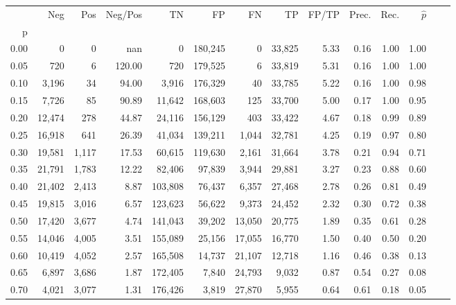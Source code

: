 \begin{tabular}{rrrrrrrrrrrrrr}
\toprule
{} &     Neg &    Pos & Neg/Pos &       TN &       FP &      FN &      TP & FP/TP & Prec. &  Rec. & $\hat{p}$ \\
p    &         &        &         &          &          &         &         &       &       &       &           \\
\midrule
0.00 &       0 &      0 &     nan &        0 &  180,245 &       0 &  33,825 &  5.33 &  0.16 &  1.00 &      1.00 \\
0.05 &     720 &      6 &  120.00 &      720 &  179,525 &       6 &  33,819 &  5.31 &  0.16 &  1.00 &      1.00 \\
0.10 &   3,196 &     34 &   94.00 &    3,916 &  176,329 &      40 &  33,785 &  5.22 &  0.16 &  1.00 &      0.98 \\
0.15 &   7,726 &     85 &   90.89 &   11,642 &  168,603 &     125 &  33,700 &  5.00 &  0.17 &  1.00 &      0.95 \\
0.20 &  12,474 &    278 &   44.87 &   24,116 &  156,129 &     403 &  33,422 &  4.67 &  0.18 &  0.99 &      0.89 \\
0.25 &  16,918 &    641 &   26.39 &   41,034 &  139,211 &   1,044 &  32,781 &  4.25 &  0.19 &  0.97 &      0.80 \\
0.30 &  19,581 &  1,117 &   17.53 &   60,615 &  119,630 &   2,161 &  31,664 &  3.78 &  0.21 &  0.94 &      0.71 \\
0.35 &  21,791 &  1,783 &   12.22 &   82,406 &   97,839 &   3,944 &  29,881 &  3.27 &  0.23 &  0.88 &      0.60 \\
0.40 &  21,402 &  2,413 &    8.87 &  103,808 &   76,437 &   6,357 &  27,468 &  2.78 &  0.26 &  0.81 &      0.49 \\
0.45 &  19,815 &  3,016 &    6.57 &  123,623 &   56,622 &   9,373 &  24,452 &  2.32 &  0.30 &  0.72 &      0.38 \\
0.50 &  17,420 &  3,677 &    4.74 &  141,043 &   39,202 &  13,050 &  20,775 &  1.89 &  0.35 &  0.61 &      0.28 \\
0.55 &  14,046 &  4,005 &    3.51 &  155,089 &   25,156 &  17,055 &  16,770 &  1.50 &  0.40 &  0.50 &      0.20 \\
0.60 &  10,419 &  4,052 &    2.57 &  165,508 &   14,737 &  21,107 &  12,718 &  1.16 &  0.46 &  0.38 &      0.13 \\
0.65 &   6,897 &  3,686 &    1.87 &  172,405 &    7,840 &  24,793 &   9,032 &  0.87 &  0.54 &  0.27 &      0.08 \\
0.70 &   4,021 &  3,077 &    1.31 &  176,426 &    3,819 &  27,870 &   5,955 &  0.64 &  0.61 &  0.18 &      0.05 \\

\end{tabular}
